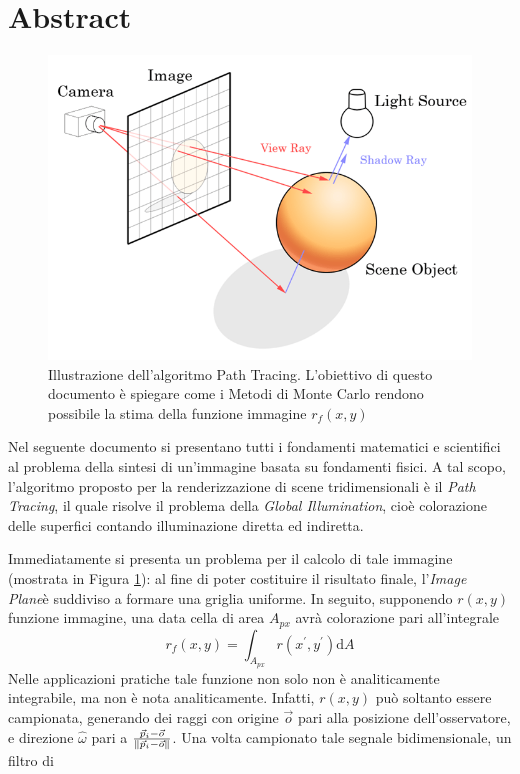 \documentclass[10pt, openany]{book}
\theoremstyle{theoremdd}
\begin{document}
	\section*{Abstract}
	\begin{figure}[t]
		\centering
		\includegraphics[width=0.6\linewidth]{./assets/intro_path_tracing_online_tech_tips.png}
		\caption{Illustrazione dell'algoritmo Path Tracing. L'obiettivo di questo documento \`e spiegare come i Metodi di Monte Carlo rendono 
			possibile la stima della funzione immagine $r_f(x,y)$}
		\label{intro:pathTracing}
	\end{figure}
	Nel seguente documento si presentano tutti i fondamenti matematici e scientifici al problema della sintesi di un'immagine basata su fondamenti 
	fisici. A tal scopo, l'algoritmo proposto per la renderizzazione di scene tridimensionali \`e il \textit{Path Tracing}, il quale risolve il problema
	della \textit{Global Illumination}, cio\`e colorazione delle superfici contando illuminazione diretta ed indiretta.\par
	Immediatamente si presenta un problema per il calcolo di tale immagine (mostrata in Figura \ref{intro:pathTracing}): al fine di poter costituire 
	il risultato finale, l'\textit{Image Plane}\footnotemark \`e suddiviso a formare una griglia uniforme. In seguito, 
	supponendo $r(x,y)$ funzione immagine,
	una data cella di area $A_{px}$ avr\`a colorazione pari all'integrale 
	\begin{equation}
		r_f(x,y)=\int_{A_{px}}r(x^\prime,y^\prime)\mathrm{d}A
	\end{equation}
	Nelle applicazioni pratiche tale funzione non solo non \`e analiticamente integrabile, ma non \`e nota analiticamente. Infatti, $r(x,y)$
	pu\`o soltanto essere campionata, generando dei raggi con origine $\vec{o}$ pari alla posizione dell'osservatore, e direzione $\hat{\omega}$
	pari a $\mathmakebox{\tfrac{\vec{p}_i-\vec{o}}{\norm{\vec{p}_i-\vec{o}}}}$. Una volta campionato tale segnale bidimensionale, un filtro di
\end{document}

